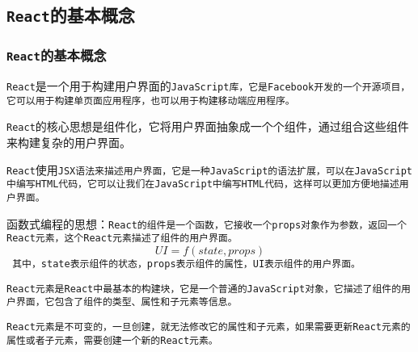 \documentclass{beamer}
\begin{document}
\subsection{\texttt{React}的基本概念}
\begin{frame}
  \frametitle{\texttt{React}的基本概念}
  \texttt{React}是一个用于构建用户界面的\tt{JavaScript}库，它是\tt{Facebook}开发的一个开源项目，它可以用于构建单页面应用程序，也可以用于构建移动端应用程序。

  \vspace{1em}

  \texttt{React}的核心思想是组件化，它将用户界面抽象成一个个组件，通过组合这些组件来构建复杂的用户界面。

  \vspace{1em}

  \texttt{React}使用\tt{JSX}语法来描述用户界面，它是一种\tt{JavaScript}的语法扩展，可以在\tt{JavaScript}中编写\tt{HTML}代码，它可以让我们在\tt{JavaScript}中编写\tt{HTML}代码，这样可以更加方便地描述用户界面。

  \framebreak

  函数式编程的思想：\tt{React}的组件是一个函数，它接收一个\tt{props}对象作为参数，返回一个\tt{React}元素，这个\tt{React}元素描述了组件的用户界面。
  $$UI=f(state, props)$$
  其中，\tt{state}表示组件的状态，\tt{props}表示组件的属性，\tt{UI}表示组件的用户界面。

  \vspace{1em}

  \tt{React}元素是\tt{React}中最基本的构建块，它是一个普通的\tt{JavaScript}对象，它描述了组件的用户界面，它包含了组件的类型、属性和子元素等信息。

  \vspace{1em}

  \tt{React}元素是不可变的，一旦创建，就无法修改它的属性和子元素，如果需要更新\tt{React}元素的属性或者子元素，需要创建一个新的\tt{React}元素。
\end{frame}
\end{document}
